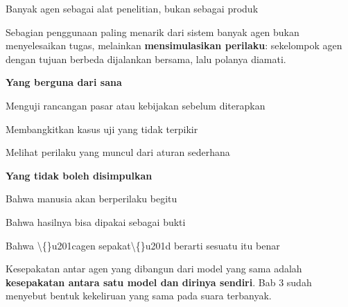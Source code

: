 \documentclass[aspectratio=169,11pt,t]{beamer}
\begin{document}
\begin{frame}[shrink=25]{Banyak agen sebagai alat penelitian, bukan sebagai produk}
{\fontsize{9.4}{12.6}\selectfont\color{fg2}Sebagian penggunaan paling menarik dari sistem banyak agen bukan menyelesaikan tugas, melainkan \textbf{mensimulasikan perilaku}: sekelompok agen dengan tujuan berbeda dijalankan bersama, lalu polanya diamati.\par}\vskip 4pt
\begin{minipage}[t]{0.485\textwidth}
{\fontsize{9.4}{12.6}\selectfont\color{fg2}\textbf{Yang berguna dari sana}\par}\vskip 4pt
\begin{ibullets}
\item Menguji rancangan pasar atau kebijakan sebelum diterapkan
\item Membangkitkan kasus uji yang tidak terpikir
\item Melihat perilaku yang muncul dari aturan sederhana
\end{ibullets}

\end{minipage}%
\hfill
\begin{minipage}[t]{0.485\textwidth}
{\fontsize{9.4}{12.6}\selectfont\color{fg2}\textbf{Yang tidak boleh disimpulkan}\par}\vskip 4pt
\begin{ibullets}
\item Bahwa manusia akan berperilaku begitu
\item Bahwa hasilnya bisa dipakai sebagai bukti
\item Bahwa \textbackslash\{\}u201cagen sepakat\textbackslash\{\}u201d berarti sesuatu itu benar
\end{ibullets}

\end{minipage}%
\begin{iband}[signal]
Kesepakatan antar agen yang dibangun dari model yang sama adalah \textbf{kesepakatan antara satu model dan dirinya sendiri}. Bab 3 sudah menyebut bentuk kekeliruan yang sama pada suara terbanyak.
\end{iband}
\end{frame}
\end{document}
